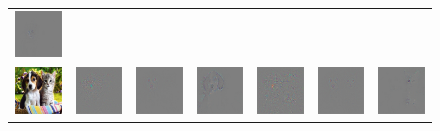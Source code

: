 \begin{figure}
\begin{center}
\begin{tabular}{ccccccc}
\includegraphics[width=0.14\linewidth,height=0.115\linewidth]{figs/examples/googlenet/soft/dog-cat1_diff_286} \\
\vspace{-2.5pt}
\includegraphics[width=0.14\linewidth,height=0.115\linewidth]{figs/examples/googlenet/oxford/dog-cat2} &
\includegraphics[width=0.14\linewidth,height=0.115\linewidth]{figs/examples/googlenet/oxford/dog-cat2_diff_163} &
\includegraphics[width=0.14\linewidth,height=0.115\linewidth]{figs/examples/googlenet/deconv/dog-cat2_diff_163} &
\includegraphics[width=0.14\linewidth,height=0.115\linewidth]{figs/examples/googlenet/soft/dog-cat2_diff_163} &
\includegraphics[width=0.14\linewidth,height=0.115\linewidth]{figs/examples/googlenet/oxford/dog-cat2_diff_286} &
\includegraphics[width=0.14\linewidth,height=0.115\linewidth]{figs/examples/googlenet/deconv/dog-cat2_diff_286} &
\includegraphics[width=0.14\linewidth,height=0.115\linewidth]{figs/examples/googlenet/soft/dog-cat2_diff_286} \\

\end{tabular}
\end{center}
\end{figure}
